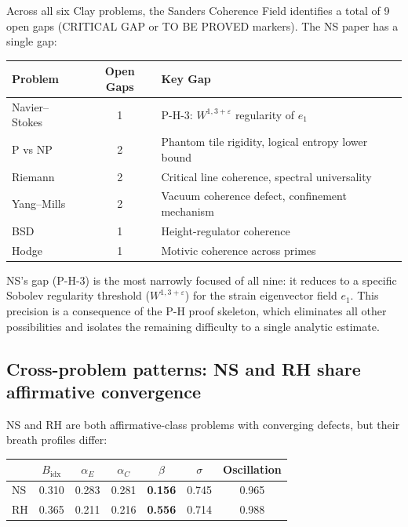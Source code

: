 \documentclass[11pt]{article}
\theoremstyle{definition}
\theoremstyle{remark}
\newcommand{\eps}{\varepsilon}
\begin{document}
Across all six Clay problems, the Sanders Coherence Field identifies a total
of 9 open gaps (CRITICAL GAP or TO BE PROVED markers).  The NS paper has a
single gap:

\begin{center}
\begin{tabular}{lcl}
\hline
\textbf{Problem} & \textbf{Open Gaps} & \textbf{Key Gap} \\
\hline
Navier--Stokes & 1 & P-H-3: $W^{1,3+\eps}$ regularity of $e_1$ \\
P vs NP & 2 & Phantom tile rigidity, logical entropy lower bound \\
Riemann & 2 & Critical line coherence, spectral universality \\
Yang--Mills & 2 & Vacuum coherence defect, confinement mechanism \\
BSD & 1 & Height-regulator coherence \\
Hodge & 1 & Motivic coherence across primes \\
\hline
\end{tabular}
\end{center}

\noindent
NS's gap (P-H-3) is the most narrowly focused of all nine: it reduces to a
specific Sobolev regularity threshold ($W^{1,3+\eps}$) for the strain
eigenvector field $e_1$.  This precision is a consequence of the P-H proof
skeleton, which eliminates all other possibilities and isolates the remaining
difficulty to a single analytic estimate.

\subsection{Cross-problem patterns: NS and RH share affirmative convergence}

NS and RH are both affirmative-class problems with converging defects, but their
breath profiles differ:

\begin{center}
\begin{tabular}{lcccccc}
\hline
& $B_{\mathrm{idx}}$ & $\alpha_E$ & $\alpha_C$ & $\beta$ & $\sigma$ & Oscillation \\
\hline
NS & 0.310 & 0.283 & 0.281 & \textbf{0.156} & 0.745 & 0.965 \\
RH & 0.365 & 0.211 & 0.216 & \textbf{0.556} & 0.714 & 0.988 \\
\hline
\end{tabular}
\end{center}
\end{document}
